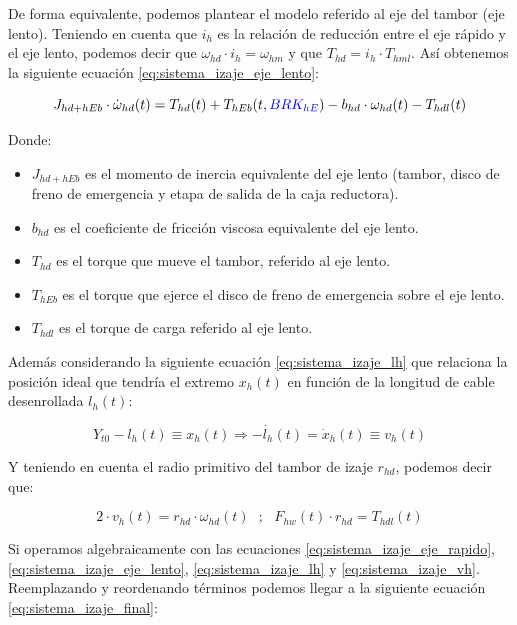 \documentclass[11pt]{article}
\begin{document}
De forma equivalente, podemos plantear el modelo referido al eje del tambor (eje lento). Teniendo en cuenta que $i_{h}$ es la relación de reducción entre el eje rápido y el eje lento, podemos decir que $\omega_{hd}\cdot i_{h}=\omega_{hm}$ y que $T_{hd}=i_{h}\cdot T_{hml}$.
Así obtenemos la siguiente ecuación \ref{eq:sistema_izaje_eje_lento}:

\begin{equation}
	\label{eq:sistema_izaje_eje_lento}
	J_{hd+hEb}\cdot\dot{\omega}_{hd}(t)=T_{hd}(t)+T_{hEb}(t,{\color{blue}BRK_{hE}})-b_{hd}\cdot\omega_{hd}(t)-T_{hdl}(t)
\end{equation}

Donde:

\begin{itemize}
	\item $J_{hd+hEb}$ es el momento de inercia equivalente del eje lento (tambor, disco de freno de emergencia y etapa de salida de la caja reductora).
	\item $b_{hd}$ es el coeficiente de fricción viscosa equivalente del eje lento.
	\item $T_{hd}$ es el torque que mueve el tambor, referido al eje lento.
	\item $T_{hEb}$ es el torque que ejerce el disco de freno de emergencia sobre el eje lento.
	\item $T_{hdl}$ es el torque de carga referido al eje lento.
\end{itemize}

Además considerando la siguiente ecuación \ref{eq:sistema_izaje_lh} que relaciona la posición ideal que tendría el extremo $x_{h}(t)$ en función de la longitud de cable desenrollada $l_{h}(t)$:

\begin{equation}
	\label{eq:sistema_izaje_lh}
	Y_{t0}-l_{h}(t)\equiv x_{h}(t) \Rightarrow -\dot{l_{h}}(t)=\dot{x}_{h}(t)\equiv v_{h}(t)
\end{equation}

Y teniendo en cuenta el radio primitivo del tambor de izaje $r_{hd}$, podemos decir que:

\begin{equation}
	\label{eq:sistema_izaje_vh}
	2\cdot v_{h}(t)=r_{hd}\cdot \omega_{hd}(t)\ \ \ ;\ \ \ F_{hw}(t)\cdot r_{hd}=T_{hdl}(t)
\end{equation}

Si operamos algebraicamente con las ecuaciones \ref{eq:sistema_izaje_eje_rapido}, \ref{eq:sistema_izaje_eje_lento}, \ref{eq:sistema_izaje_lh} y \ref{eq:sistema_izaje_vh}. Reemplazando y reordenando términos podemos llegar a la siguiente ecuación \ref{eq:sistema_izaje_final}:
\end{document}
